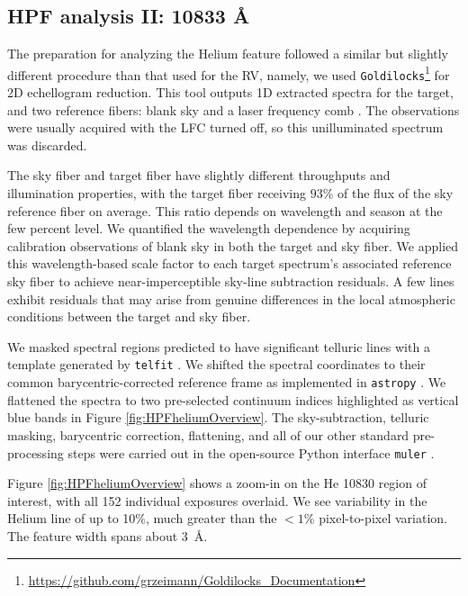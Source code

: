 \documentclass[twocolumn]{aastex631}
\begin{document}
\subsection{HPF analysis II:  10833 \AA}
The preparation for analyzing the Helium feature followed a similar but slightly different procedure than that used for the RV, namely, we used \texttt{Goldilocks}\footnote{\url{https://github.com/grzeimann/Goldilocks_Documentation}} for 2D echellogram reduction.  This tool outputs 1D extracted spectra for the target, and two reference fibers: blank sky and a laser frequency comb \citep[LFC,][]{2019Optic...6..233M}.  The observations were usually acquired with the LFC turned off, so this unilluminated spectrum was discarded.

The sky fiber and target fiber have slightly different throughputs and illumination properties, with the target fiber receiving $93\%$ of the flux of the sky reference fiber on average.  This ratio depends on wavelength and season at the few percent level.  We quantified the wavelength dependence by acquiring calibration observations of blank sky in both the target and sky fiber.  We applied this wavelength-based scale factor to each target spectrum's associated reference sky fiber to achieve near-imperceptible sky-line subtraction residuals.  A few lines exhibit residuals that may arise from genuine differences in the local atmospheric conditions between the target and sky fiber.

We masked spectral regions predicted to have significant telluric lines with a template generated by \texttt{telfit} \citep{2014AJ....148...53G}.  We shifted the spectral coordinates to their common barycentric-corrected reference frame \citep{2014PASP..126..838W} as implemented in \texttt{astropy} \citep{2013A&A...558A..33A,2018AJ....156..123A,2022ApJ...935..167A}.  We flattened the spectra to two pre-selected continuum indices highlighted as vertical blue bands in Figure \ref{fig:HPFheliumOverview}.  The sky-subtraction, telluric masking, barycentric correction, flattening, and all of our other standard pre-processing steps were carried out in the open-source Python interface \texttt{muler} \citep{2022JOSS....7.4302G}.

Figure \ref{fig:HPFheliumOverview} shows a zoom-in on the He 10830 region of interest, with all 152 individual exposures overlaid.  We see variability in the Helium line of up to 10\%, much greater than the $<1\%$ pixel-to-pixel variation.  The feature width spans about 3~\AA.
\end{document}
